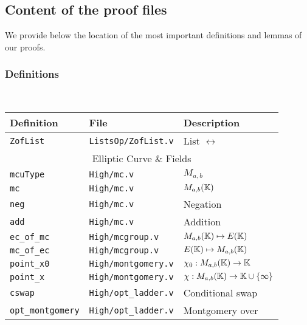 \subsection{Content of the proof files}
\label{appendix:proof-files}

We provide below the location of the most important definitions and lemmas of our proofs.

\subsubsection{Definitions}
~
\begin{table}[h]
  \begin{tabular}{ l | l | l }
    Definition & File & Description \\
    \hline
    \texttt{ZofList} & \texttt{ListsOp/ZofList.v} & List $\leftrightarrow$ \Z\\
    \hline
    \multicolumn{3}{c}{Elliptic Curve \& Fields }\\
    \hline
    \texttt{mcuType} & \texttt{High/mc.v} & $M_{a,b}$ \\
    \texttt{mc} & \texttt{High/mc.v} & $M_{a,b}(\mathbb{K})$ \\
    \texttt{neg} & \texttt{High/mc.v} & Negation \\
    \texttt{add} & \texttt{High/mc.v} & Addition \\
    \texttt{ec\_of\_mc} & \texttt{High/mcgroup.v} & $M_{a,b}(\mathbb{K}) \mapsto E(\mathbb{K})$ \\
    \texttt{mc\_of\_ec} & \texttt{High/mcgroup.v} & $E(\mathbb{K}) \mapsto M_{a,b}(\mathbb{K})$ \\
    \texttt{point\_x0} & \texttt{High/montgomery.v} & $\chi_0 : M_{a,b}(\mathbb{K}) \to \mathbb{K}$ \\
    \texttt{point\_x} & \texttt{High/montgomery.v} & $\chi : M_{a,b}(\mathbb{K}) \to \mathbb{K} \cup \{\infty\}$ \\
    \texttt{cswap} & \texttt{High/opt\_ladder.v} & Conditional swap \\
    \texttt{opt\_montgomery} & \texttt{High/opt\_ladder.v} & Montgomery over \K \\

\end{tabular}
\end{table}
